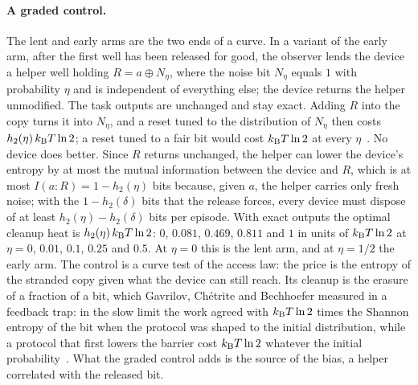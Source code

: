 \paragraph{A graded control.} The lent and early arms are the two ends of a curve. In a variant of the early arm, after the first well has been released for good, the observer lends the device a helper well holding $R=a\oplus N_\eta$, where the noise bit $N_\eta$ equals $1$ with probability $\eta$ and is independent of everything else; the device returns the helper unmodified. The task outputs are unchanged and stay exact. Adding $R$ into the copy turns it into $N_\eta$, and a reset tuned to the distribution of $N_\eta$ then costs $h_2(\eta)\,k_{\mathrm B} T\ln2$; a reset tuned to a fair bit would cost $k_{\mathrm B} T\ln2$ at every $\eta$~\cite{KolchinskyWolpert17}. No device does better. Since $R$ returns unchanged, the helper can lower the device's entropy by at most the mutual information between the device and $R$, which is at most $I(a{:}R)=1-h_2(\eta)$ bits because, given $a$, the helper carries only fresh noise; with the $1-h_2(\delta)$ bits that the release forces, every device must dispose of at least $h_2(\eta)-h_2(\delta)$ bits per episode. With exact outputs the optimal cleanup heat is $h_2(\eta)\,k_{\mathrm B} T\ln2$: $0$, $0.081$, $0.469$, $0.811$ and $1$ in units of $k_{\mathrm B} T\ln2$ at $\eta=0$, $0.01$, $0.1$, $0.25$ and $0.5$. At $\eta=0$ this is the lent arm, and at $\eta=1/2$ the early arm. The control is a curve test of the access law: the price is the entropy of the stranded copy given what the device can still reach. Its cleanup is the erasure of a fraction of a bit, which Gavrilov, Ch\'etrite and Bechhoefer measured in a feedback trap: in the slow limit the work agreed with $k_{\mathrm B} T\ln2$ times the Shannon entropy of the bit when the protocol was shaped to the initial distribution, while a protocol that first lowers the barrier cost $k_{\mathrm B} T\ln2$ whatever the initial probability~\cite{Gavrilov17}. What the graded control adds is the source of the bias, a helper correlated with the released bit.

